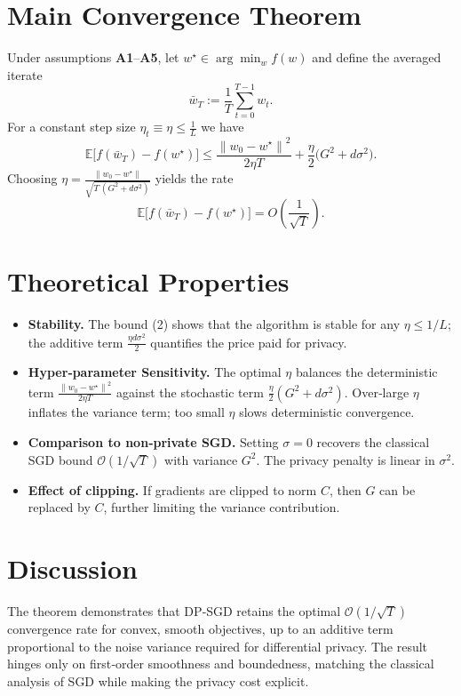 \documentclass{article}
\newcommand{\E}{\mathbb{E}}
\newcommand{\norm}[1]{\left\|#1\right\|}
\begin{document}
\section*{Main Convergence Theorem}
\begin{theorem}\label{thm:conv}
Under assumptions \textbf{A1}–\textbf{A5}, let $w^{\star}\in\arg\min_{w}f(w)$ and define the averaged iterate
\[
\bar w_T:=\frac{1}{T}\sum_{t=0}^{T-1}w_t .
\]
For a constant step size $\eta_t\equiv\eta\le\frac{1}{L}$ we have
\[
\boxed{
\E\!\big[f(\bar w_T)-f(w^{\star})\big]\le
\frac{\norm{w_0-w^{\star}}^{2}}{2\eta T}
+\frac{\eta}{2}\big(G^{2}+d\sigma^{2}\big).
}
\tag{2}
\]
Choosing $\eta=\frac{\norm{w_0-w^{\star}}}{\sqrt{T\,(G^{2}+d\sigma^{2})}}$ yields the rate
\[
\E\!\big[f(\bar w_T)-f(w^{\star})\big]=O\!\left(\frac{1}{\sqrt{T}}\right).
\tag{3}
\]
\end{theorem}

\section*{Theoretical Properties}
\begin{itemize}
\item \textbf{Stability.} The bound (2) shows that the algorithm is stable for any $\eta\le 1/L$; the additive term $\frac{\eta d\sigma^{2}}{2}$ quantifies the price paid for privacy.
\item \textbf{Hyper‑parameter Sensitivity.} The optimal $\eta$ balances the deterministic term $\frac{\norm{w_0-w^{\star}}^{2}}{2\eta T}$ against the stochastic term $\frac{\eta}{2}(G^{2}+d\sigma^{2})$. Over‑large $\eta$ inflates the variance term; too small $\eta$ slows deterministic convergence.
\item \textbf{Comparison to non‑private SGD.} Setting $\sigma=0$ recovers the classical SGD bound $\mathcal{O}(1/\sqrt{T})$ with variance $G^{2}$. The privacy penalty is linear in $\sigma^{2}$.
\item \textbf{Effect of clipping.} If gradients are clipped to norm $C$, then $G$ can be replaced by $C$, further limiting the variance contribution.
\end{itemize}

\section*{Discussion}
The theorem demonstrates that DP‑SGD retains the optimal $\mathcal{O}(1/\sqrt{T})$ convergence rate for convex, smooth objectives, up to an additive term proportional to the noise variance required for differential privacy. The result hinges only on first‑order smoothness and boundedness, matching the classical analysis of SGD while making the privacy cost explicit.
\end{document}
